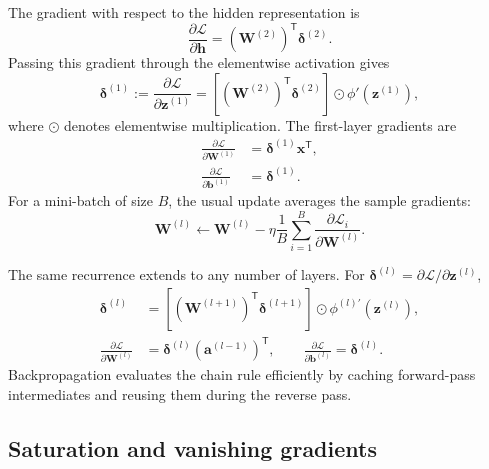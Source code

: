 The gradient with respect to the hidden representation is
\[
    \frac{\partial\mathcal{L}}{\partial\mathbf{h}}
    =\left(\mathbf{W}^{(2)}\right)^{\mathsf T}
      \boldsymbol{\delta}^{(2)}.
\]
Passing this gradient through the elementwise activation gives
\begin{equation}
    \boldsymbol{\delta}^{(1)}
    :=\frac{\partial\mathcal{L}}{\partial\mathbf{z}^{(1)}}
    =\left[
      \left(\mathbf{W}^{(2)}\right)^{\mathsf T}
      \boldsymbol{\delta}^{(2)}
    \right]
    \odot
    \phi'\!\left(\mathbf{z}^{(1)}\right),
    \label{eq:delta-one}
\end{equation}
where \(\odot\) denotes elementwise multiplication. The first-layer gradients are
\begin{align}
    \frac{\partial\mathcal{L}}{\partial\mathbf{W}^{(1)}}
    &=\boldsymbol{\delta}^{(1)}\mathbf{x}^{\mathsf T},
    \label{eq:grad-w1}\\
    \frac{\partial\mathcal{L}}{\partial\mathbf{b}^{(1)}}
    &=\boldsymbol{\delta}^{(1)}.
    \label{eq:grad-b1}
\end{align}
For a mini-batch of size \(B\), the usual update averages the sample gradients:
\[
    \mathbf{W}^{(l)}
    \leftarrow
    \mathbf{W}^{(l)}
    -\eta\frac{1}{B}
    \sum_{i=1}^{B}
    \frac{\partial\mathcal{L}_i}
         {\partial\mathbf{W}^{(l)}}.
\]

The same recurrence extends to any number of layers. For
\(\boldsymbol{\delta}^{(l)}=
\partial\mathcal{L}/\partial\mathbf{z}^{(l)}\),
\begin{align}
    \boldsymbol{\delta}^{(l)}
    &=\left[
      \left(\mathbf{W}^{(l+1)}\right)^{\mathsf T}
      \boldsymbol{\delta}^{(l+1)}
    \right]
    \odot
    \phi^{(l)\prime}\!\left(\mathbf{z}^{(l)}\right),
    \label{eq:general-backprop-delta}\\
    \frac{\partial\mathcal{L}}{\partial\mathbf{W}^{(l)}}
    &=\boldsymbol{\delta}^{(l)}
      \left(\mathbf{a}^{(l-1)}\right)^{\mathsf T},
    \qquad
    \frac{\partial\mathcal{L}}{\partial\mathbf{b}^{(l)}}
    =\boldsymbol{\delta}^{(l)}.
    \label{eq:general-backprop-parameter}
\end{align}
Backpropagation evaluates the chain rule efficiently by caching forward-pass intermediates and reusing them during the reverse pass.

\subsection{Saturation and vanishing gradients}

